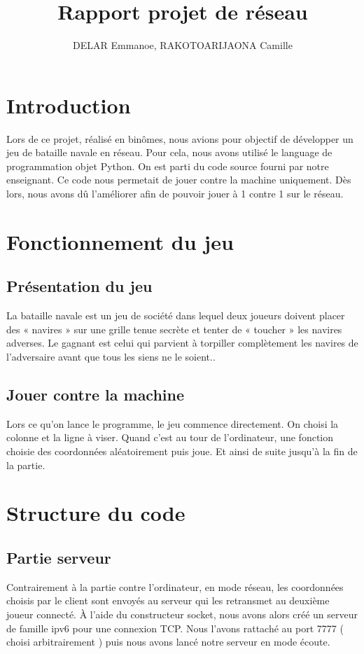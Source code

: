 \documentclass{article}
\title{Rapport projet de r\'eseau}
\author{DELAR Emmanoe, RAKOTOARIJAONA Camille}
\begin{document}
\maketitle
\newpage
\tableofcontents

\newpage
\section{Introduction}
Lors de ce projet, r\'ealis\'e en bin\^omes, nous avions pour objectif de d\'evelopper un jeu de bataille navale en r\'eseau. Pour cela, nous avons utilis\'e le language de programmation objet Python.
On est parti du code source fourni par notre enseignant. Ce code nous permetait de jouer contre la machine uniquement. D\`es lors, nous avons d\^u l'am\'eliorer afin de pouvoir jouer \`a 1 contre 1 sur le r\'eseau.  

\section{Fonctionnement du jeu}
	 \subsection{Pr\'esentation du jeu}
	 La bataille navale est un jeu de soci\'et\'e dans lequel deux joueurs doivent placer des « navires » sur une grille tenue secrète et tenter de « toucher » les navires adverses. Le gagnant est celui qui parvient à torpiller compl\`etement les navires de l'adversaire avant que tous les siens ne le soient..

	 \subsection{Jouer contre la machine}
	 Lors ce qu'on lance le programme, le jeu commence directement. On choisi la colonne et la ligne \`a viser. Quand c'est au tour de l'ordinateur, une fonction choisie des coordonn\'ees al\'eatoirement puis joue. Et ainsi de suite jusqu'\`a la fin de la partie. 

\section{Structure du code}
	\subsection{Partie serveur}
	Contrairement \`a la partie contre l'ordinateur, en mode r\'eseau, les coordonn\'ees choisis par le client sont envoy\'es au serveur qui les retransmet au deuxi\`eme joueur connect\'e.
	\`A l'aide du constructeur socket, nous avons alors cr\'e\'e un serveur de famille ipv6 pour une connexion TCP.
	Nous l'avons rattach\'e au port 7777 ( choisi arbitrairement ) puis nous avons lanc\'e notre serveur en mode \'ecoute.
\end{document}
